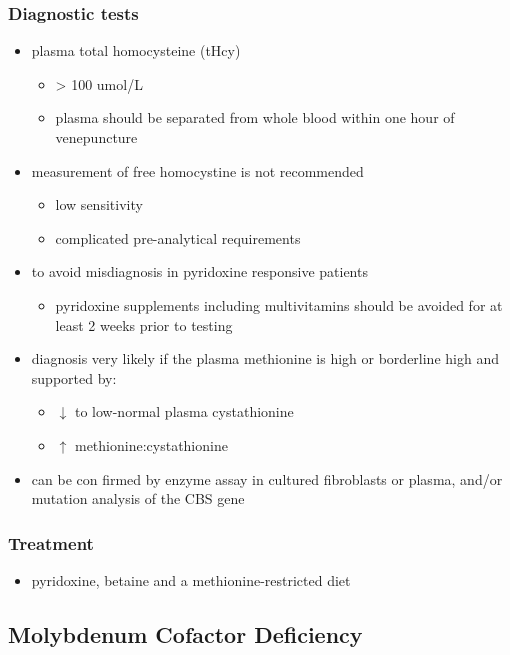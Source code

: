 \documentclass{scrartcl}
\begin{document}
\subsubsection{Diagnostic tests}
\label{sec:org5367f99}
\begin{itemize}
\item plasma total homocysteine (tHcy)
\begin{itemize}
\item \textgreater{} 100 umol/L
\item plasma should be separated from whole blood within one hour of venepuncture
\end{itemize}
\item measurement of free homocystine is not recommended
\begin{itemize}
\item low sensitivity
\item complicated pre-analytical requirements
\end{itemize}
\item to avoid misdiagnosis in pyridoxine responsive patients
\begin{itemize}
\item pyridoxine supplements including multivitamins should be avoided
for at least 2 weeks prior to testing
\end{itemize}
\item diagnosis very likely if the plasma methionine is high or borderline
high and supported by:
\begin{itemize}
\item \(\downarrow\) to low-normal plasma cystathionine
\item \(\uparrow\) methionine:cystathionine
\end{itemize}
\item can be con firmed by enzyme assay in cultured fibroblasts or plasma,
and/or mutation analysis of the CBS gene
\end{itemize}

\subsubsection{Treatment}
\label{sec:org395f5b0}
\begin{itemize}
\item pyridoxine, betaine and a methionine-restricted diet
\end{itemize}

\subsection{Molybdenum Cofactor Deficiency}
\label{sec:org038c5a2}
\end{document}
